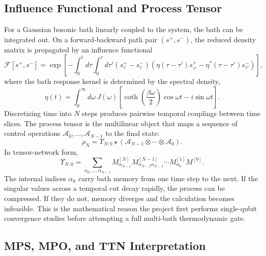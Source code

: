 \documentclass[11pt]{article}
\begin{document}
\subsection{Influence Functional and Process Tensor}

For a Gaussian bosonic bath linearly coupled to the system, the bath can be integrated out.
On a forward-backward path pair $(s^+,s^-)$, the reduced density matrix is propagated by an
influence functional
\begin{equation}
    \mathcal{F}[s^+,s^-]
    =
    \exp\left[
        -\int_0^t d\tau
        \int_0^\tau d\tau'
        \left(s^+_\tau-s^-_\tau\right)
        \left(
            \eta(\tau-\tau')s^+_{\tau'}
            -
            \eta^\ast(\tau-\tau')s^-_{\tau'}
        \right)
    \right],
\end{equation}
where the bath response kernel is determined by the spectral density,
\begin{equation}
    \eta(t)
    =
    \int_0^\infty d\omega\,
    J(\omega)
    \left[
        \coth\left(\frac{\beta\omega}{2}\right)\cos\omega t
        -
        i\sin\omega t
    \right].
\end{equation}
Discretizing time into $N$ steps produces pairwise temporal couplings between time slices.
The process tensor is the multilinear object that maps a sequence of control operations
$\mathcal{A}_0,\ldots,\mathcal{A}_{N-1}$ to the final state:
\begin{equation}
    \rho_N
    =
    \Upsilon_{N:0}
    \star
    \left(
        \mathcal{A}_{N-1}\otimes\cdots\otimes\mathcal{A}_0
    \right).
\end{equation}
In tensor-network form,
\begin{equation}
    \Upsilon_{N:0}
    =
    \sum_{\alpha_0,\ldots,\alpha_{N-1}}
    M^{[N]}_{\alpha_{N-1}}
    M^{[N-1]}_{\alpha_{N-2}\alpha_{N-1}}
    \cdots
    M^{[1]}_{\alpha_0}
    M^{[0]} .
\end{equation}
The internal indices $\alpha_k$ carry bath memory from one time step to the next.  If the
singular values across a temporal cut decay rapidly, the process can be compressed.  If they
do not, memory diverges and the calculation becomes infeasible.  This is the mathematical
reason the project first performs single-qubit convergence studies before attempting a full
multi-bath thermodynamic gate.

\subsection{MPS, MPO, and TTN Interpretation}
\end{document}
